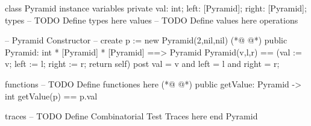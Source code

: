 \begin{vdmpp}[breaklines=true]
class Pyramid
instance variables
        private val: int;
                left: [Pyramid];
                right: [Pyramid];       
types
-- TODO Define types here
values
-- TODO Define values here
operations

-- Pyramid Constructor
-- create p := new Pyramid(2,nil,nil)
(*@
\label{Pyramid:14}
@*)
public Pyramid: int * [Pyramid] * [Pyramid] ==> Pyramid
Pyramid(v,l,r) == 
(val := v; left := l; right := r; return self)
post val = v and left = l and right = r;


functions 
-- TODO Define functiones here
(*@
\label{getValue:22}
@*)
public getValue: Pyramid -> int
getValue(p) == p.val


traces
-- TODO Define Combinatorial Test Traces here
end Pyramid
\end{vdmpp}
